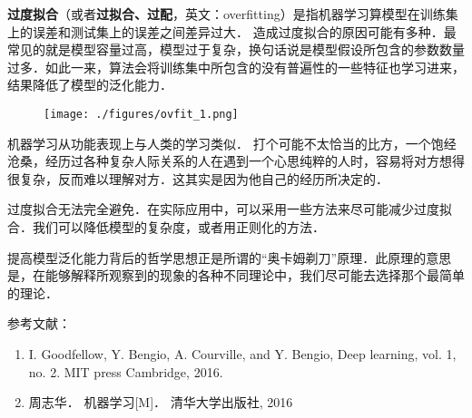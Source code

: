 
\textbf{过度拟合}（或者\textbf{过拟合、过配}，英文：overfitting）是指机器学习算模型在训练集上的误差和测试集上的误差之间差异过大．
造成过度拟合的原因可能有多种．最常见的就是模型容量过高，模型过于复杂，换句话说是模型假设所包含的参数数量过多．如此一来，算法会将训练集中所包含的没有普遍性的一些特征也学习进来，结果降低了模型的泛化能力．

\begin{figure}[ht]
\centering
\texttt{[image: ./figures/ovfit\_1.png]}
\caption{} \label{ovfit_fig1}
\end{figure}

机器学习从功能表现上与人类的学习类似．
打个可能不太恰当的比方，一个饱经沧桑，经历过各种复杂人际关系的人在遇到一个心思纯粹的人时，容易将对方想得很复杂，反而难以理解对方．这其实是因为他自己的经历所决定的．

过度拟合无法完全避免．在实际应用中，可以采用一些方法来尽可能减少过度拟合．我们可以降低模型的复杂度，或者用正则化的方法．

提高模型泛化能力背后的哲学思想正是所谓的“奥卡姆剃刀”原理．此原理的意思是，在能够解释所观察到的现象的各种不同理论中，我们尽可能去选择那个最简单的理论．



参考文献：
\begin{enumerate}
\item I. Goodfellow, Y. Bengio, A. Courville, and Y. Bengio, Deep learning, vol. 1, no. 2. MIT press Cambridge, 2016.
\item 周志华． 机器学习[M]． 清华大学出版社, 2016
\end{enumerate}